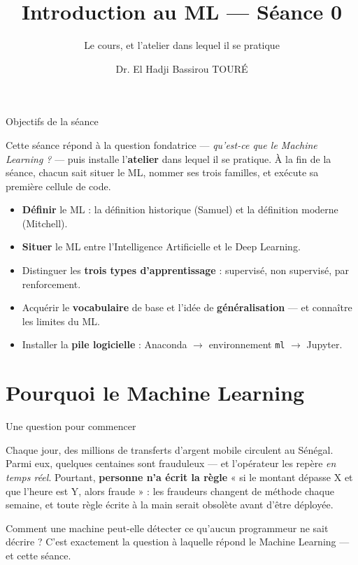 \documentclass[aspectratio=169,11pt]{beamer}
\title{Introduction au ML — Séance 0}
\subtitle{Le cours, et l'atelier dans lequel il se pratique}
\author{Dr. El Hadji Bassirou TOURÉ}
\institute{Département de Mathématiques et Informatique\\ Faculté des Sciences et Techniques\\ Université Cheikh Anta Diop de Dakar}
\date{}
\begin{document}
\begin{frame}\titlepage\end{frame}

\begin{frame}{Objectifs de la séance}
\begin{ucaddef}[Contenu]
{\small Cette séance répond à la question fondatrice — \emph{qu'est-ce que le Machine Learning ?} — puis installe l'\textbf{atelier} dans lequel il se pratique. À la fin de la séance, chacun sait situer le ML, nommer ses trois familles, et exécute sa première cellule de code.}
\end{ucaddef}
\begin{itemize}\small
  \item \textbf{Définir} le ML : la définition historique (Samuel) et la définition moderne (Mitchell).
  \item \textbf{Situer} le ML entre l'Intelligence Artificielle et le Deep Learning.
  \item Distinguer les \textbf{trois types d'apprentissage} : supervisé, non supervisé, par renforcement.
  \item Acquérir le \textbf{vocabulaire} de base et l'idée de \textbf{généralisation} — et connaître les limites du ML.
  \item Installer la \textbf{pile logicielle} : Anaconda $\to$ environnement \texttt{ml} $\to$ Jupyter.
\end{itemize}
\end{frame}

\section{Pourquoi le Machine Learning}

\begin{frame}{Une question pour commencer}
\begin{ucadfront}
{\small Chaque jour, des millions de transferts d'argent mobile circulent au Sénégal. Parmi eux, quelques centaines sont frauduleux — et l'opérateur les repère \emph{en temps réel}. Pourtant, \textbf{personne n'a écrit la règle} « si le montant dépasse X et que l'heure est Y, alors fraude » : les fraudeurs changent de méthode chaque semaine, et toute règle écrite à la main serait obsolète avant d'être déployée.}
\end{ucadfront}
{\small Comment une machine peut-elle détecter ce qu'aucun programmeur ne sait décrire ? C'est exactement la question à laquelle répond le Machine Learning — et cette séance.}
\end{frame}
\end{document}
